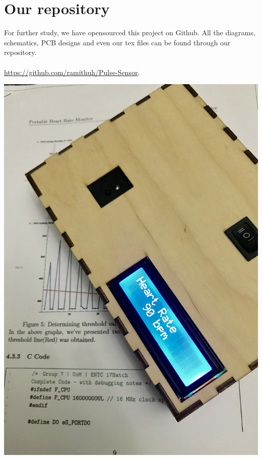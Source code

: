 \documentclass[12pt]{article}
\begin{document}
{\section{Our repository}
For further study, we have opensourced this project on Github. All the diagrams, schematics, PCB designs and even our tex files can be found through our repository.\\\\
\faGithub\href{https://github.com/ramithuh/Pulse-Sensor}{ https://github.com/ramithuh/Pulse-Sensor}.
\\
\begin{center}
	\includegraphics[scale=0.11]{images/github.jpg}
\end{center}

 
\newpage


{}


}
\end{document}
